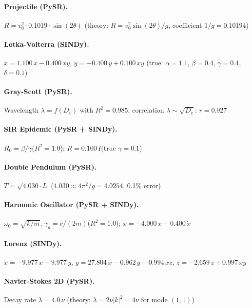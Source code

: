 \documentclass{article}
\begin{document}
\paragraph{Projectile (PySR).}
$R = v_0^2 \cdot 0.1019 \cdot \sin(2\theta)$\quad
(theory: $R = v_0^2 \sin(2\theta) / g$, coefficient $1/g = 0.10194$)

\paragraph{Lotka-Volterra (SINDy).}
$\dot{x} = 1.100\,x - 0.400\,xy$, \quad
$\dot{y} = -0.400\,y + 0.100\,xy$\quad
(true: $\alpha{=}1.1$, $\beta{=}0.4$, $\gamma{=}0.4$, $\delta{=}0.1$)

\paragraph{Gray-Scott (PySR).}
Wavelength $\lambda = f(D_v)$ with $R^2 = 0.985$;\quad
correlation $\lambda \sim \sqrt{D_v}$: $r = 0.927$

\paragraph{SIR Epidemic (PySR + SINDy).}
$R_0 = \beta / \gamma$\quad ($R^2 = 1.0$);\quad
$\dot{R} = 0.100\,I$\quad (true $\gamma = 0.1$)

\paragraph{Double Pendulum (PySR).}
$T = \sqrt{4.030 \cdot L}$\quad
($4.030 \approx 4\pi^2/g = 4.0254$, 0.1\% error)

\paragraph{Harmonic Oscillator (PySR + SINDy).}
$\omega_0 = \sqrt{k/m}$, \quad $\gamma_d = c/(2m)$\quad ($R^2 = 1.0$);\quad
$\ddot{x} = -4.000\,x - 0.400\,\dot{x}$

\paragraph{Lorenz (SINDy).}
$\dot{x} = -9.977\,x + 9.977\,y$, \quad
$\dot{y} = 27.804\,x - 0.962\,y - 0.994\,xz$, \quad
$\dot{z} = -2.659\,z + 0.997\,xy$

\paragraph{Navier-Stokes 2D (PySR).}
Decay rate $\lambda = 4.0\,\nu$\quad
(theory: $\lambda = 2\nu|k|^2 = 4\nu$ for mode $(1,1)$)
\end{document}
